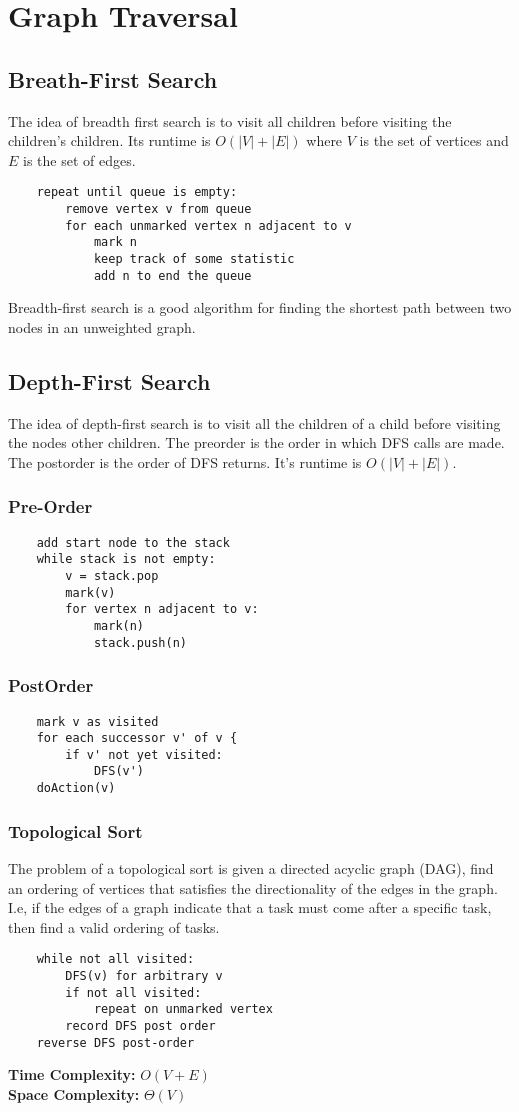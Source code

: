 \documentclass{article}
\begin{document}
\section{Graph Traversal}
\subsection{Breath-First Search}
The idea of breadth first search is to visit all children before visiting the children's children.
Its runtime is $O(|V|+|E|)$ where $V$ is the set of vertices and $E$ is the set of edges.
\begin{lstlisting}
    repeat until queue is empty:
        remove vertex v from queue
        for each unmarked vertex n adjacent to v
            mark n
            keep track of some statistic
            add n to end the queue
\end{lstlisting}
Breadth-first search is a good algorithm for finding the shortest path between two nodes in an unweighted graph.
\subsection{Depth-First Search}
The idea of depth-first search is to visit all the children of a child before visiting the nodes other children.
The preorder is the order in which DFS calls are made. The postorder is the order of DFS returns.
It's runtime is $O(|V|+|E|)$.
\subsubsection{Pre-Order}
\begin{lstlisting}
    add start node to the stack
    while stack is not empty:
        v = stack.pop
        mark(v)
        for vertex n adjacent to v:
            mark(n)
            stack.push(n)
\end{lstlisting}
\subsubsection{PostOrder}
\begin{lstlisting}
    mark v as visited
    for each successor v' of v {
        if v' not yet visited:
            DFS(v')
    doAction(v)
\end{lstlisting}
\subsubsection{Topological Sort}
The problem of a topological sort is given a directed acyclic graph (DAG), find an ordering of vertices that satisfies the directionality of the edges in the graph.
I.e, if the edges of a graph indicate that a task must come after a specific task, then find a valid ordering of tasks.
\begin{lstlisting}
    while not all visited:
        DFS(v) for arbitrary v
        if not all visited:
            repeat on unmarked vertex
        record DFS post order
    reverse DFS post-order
\end{lstlisting}
\textbf{Time Complexity: } $O(V+E)$\\
\textbf{Space Complexity: } $\Theta(V)$
\end{document}
